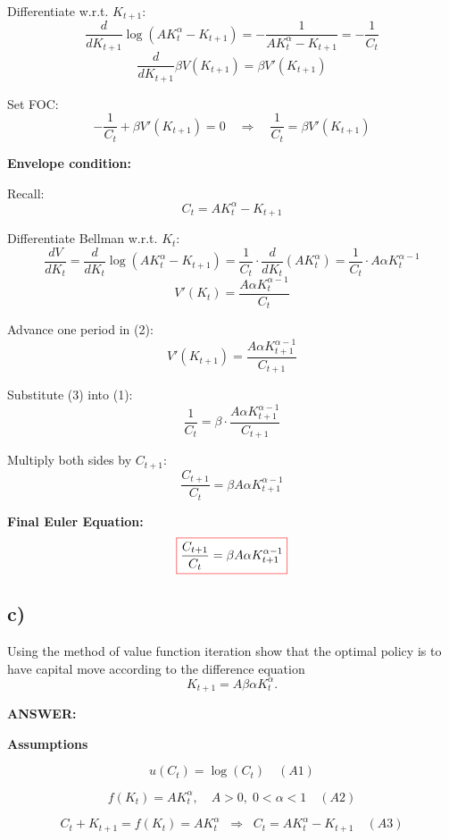 \documentclass[12pt]{article}
\begin{document}
Differentiate w.r.t. \(K_{t+1}\):
\[
\frac{d}{dK_{t+1}} \log(AK_t^{\alpha}-K_{t+1})
= -\frac{1}{AK_t^{\alpha}-K_{t+1}} = -\frac{1}{C_t}
\]
\[
\frac{d}{dK_{t+1}} \beta V(K_{t+1}) = \beta V'(K_{t+1})
\]

Set FOC:
\[
-\frac{1}{C_t} + \beta V'(K_{t+1})=0
\quad \Rightarrow \quad \frac{1}{C_t}=\beta V'(K_{t+1}) \tag{1}
\]

\vspace{0.5em}
\textbf{Envelope condition:}

Recall:
\[
C_t = A K_t^{\alpha} - K_{t+1}
\]

Differentiate Bellman w.r.t. \(K_t\):
\[
\frac{dV}{dK_t}=\frac{d}{dK_t}\log(AK_t^{\alpha}-K_{t+1})
= \frac{1}{C_t} \cdot \frac{d}{dK_t}(AK_t^{\alpha})
= \frac{1}{C_t} \cdot A\alpha K_t^{\alpha-1}
\]
\[
V'(K_t)=\frac{A\alpha K_t^{\alpha-1}}{C_t} \tag{2}
\]

Advance one period in (2):
\[
V'(K_{t+1})=\frac{A\alpha K_{t+1}^{\alpha-1}}{C_{t+1}} \tag{3}
\]

Substitute (3) into (1):
\[
\frac{1}{C_t} = \beta \cdot \frac{A\alpha K_{t+1}^{\alpha-1}}{C_{t+1}}
\]

Multiply both sides by \(C_{t+1}\):
\[
\frac{C_{t+1}}{C_t} = \beta A\alpha K_{t+1}^{\alpha-1}
\]

\vspace{0.5em}
\textbf{Final Euler Equation:}
\[
\fcolorbox{red}{white}{$
\displaystyle \frac{C_{t+1}}{C_t} = \beta A \alpha K_{t+1}^{\alpha-1}
$}
\]


\subsection*{\textbf{c)}}

Using the method of value function iteration show that the optimal policy is to have capital move according to the difference equation
\[
K_{t+1} = A \beta \alpha K_t^{\alpha}.
\]

\noindent [Hint: as a starting point set \( V_0 = 0 \).]

\vspace{0.5em}
\noindent\textcolor{formalred}{\textbf{ANSWER:}}

\textbf{Assumptions}

\[
u(C_t) = \log(C_t) \quad (A1)
\]

\[
f(K_t) = A K_t^{\alpha}, \quad A>0, \; 0<\alpha<1 \quad (A2)
\]

\[
C_t + K_{t+1} = f(K_t) = A K_t^{\alpha}
\;\;\Rightarrow\;\;
C_t = A K_t^{\alpha} - K_{t+1} \quad (A3)
\]
\end{document}
